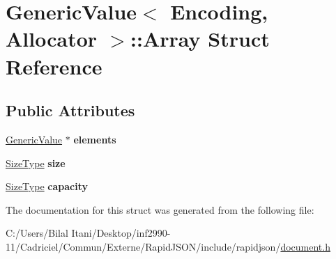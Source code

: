 \hypertarget{struct_generic_value_1_1_array}{}\section{Generic\+Value$<$ Encoding, Allocator $>$\+:\+:Array Struct Reference}
\label{struct_generic_value_1_1_array}
\subsection*{Public Attributes}
\begin{DoxyCompactItemize}
\item 
\hyperlink{class_generic_value}{Generic\+Value} $\ast$ {\bfseries elements}\hypertarget{struct_generic_value_1_1_array_a0af8e50f37486f042ab19fd871d11d4f}{}\label{struct_generic_value_1_1_array_a0af8e50f37486f042ab19fd871d11d4f}

\item 
\hyperlink{rapidjson_8h_a5ed6e6e67250fadbd041127e6386dcb5}{Size\+Type} {\bfseries size}\hypertarget{struct_generic_value_1_1_array_a60f69b3b57b86c20c123c1b080e34bcc}{}\label{struct_generic_value_1_1_array_a60f69b3b57b86c20c123c1b080e34bcc}

\item 
\hyperlink{rapidjson_8h_a5ed6e6e67250fadbd041127e6386dcb5}{Size\+Type} {\bfseries capacity}\hypertarget{struct_generic_value_1_1_array_a2f5dfb089ee750e9405d5adeda4df894}{}\label{struct_generic_value_1_1_array_a2f5dfb089ee750e9405d5adeda4df894}

\end{DoxyCompactItemize}


The documentation for this struct was generated from the following file\+:\begin{DoxyCompactItemize}
\item 
C\+:/\+Users/\+Bilal Itani/\+Desktop/inf2990-\/11/\+Cadriciel/\+Commun/\+Externe/\+Rapid\+J\+S\+O\+N/include/rapidjson/\hyperlink{document_8h}{document.\+h}\end{DoxyCompactItemize}
